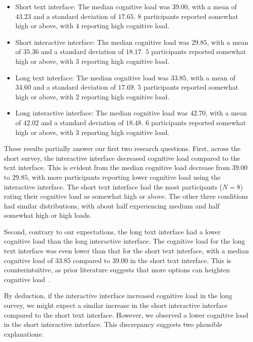 \begin{itemize}
    \item Short text interface: The median cognitive load was $39.00$, with a mean of $43.23$ and a standard deviation of $17.65$. $8$ participants reported somewhat high or above, with $4$ reporting high cognitive load.
    \item Short interactive interface: The median cognitive load was $29.85$, with a mean of $35.36$ and a standard deviation of $18.17$. $5$ participants reported somewhat high or above, with $3$ reporting high cognitive load.
    \item Long text interface: The median cognitive load was $33.85$, with a mean of $34.60$ and a standard deviation of $17.69$. $5$ participants reported somewhat high or above, with $2$ reporting high cognitive load.
    \item Long interactive interface: The median cognitive load was $42.70$, with a mean of $42.02$ and a standard deviation of $18.48$. $6$ participants reported somewhat high or above, with $3$ reporting high cognitive load.
\end{itemize}

These results partially answer our first two research questions. First, across the short survey, the interactive interface decreased cognitive load compared to the text interface. This is evident from the median cognitive load decrease from $39.00$ to $29.85$, with more participants reporting lower cognitive load using the interactive interface. The short text interface had the most participants ($N=8$) rating their cognitive load as somewhat high or above. The other three conditions had similar distributions, with about half experiencing medium and half somewhat high or high loads.

Second, contrary to our expectations, the long text interface had a lower cognitive load than the long interactive interface. The cognitive load for the long text interface was even lower than that for the short text interface, with a median cognitive load of $33.85$ compared to $39.00$ in the short text interface. This is counterintuitive, as prior literature suggests that more options can heighten cognitive load~\cite{swellerCognitiveLoadTheory2011}.

By deduction, if the interactive interface increased cognitive load in the long survey, we might expect a similar increase in the short interactive interface compared to the short text interface. However, we observed a lower cognitive load in the short interactive interface. This discrepancy suggests two plausible explanations:

